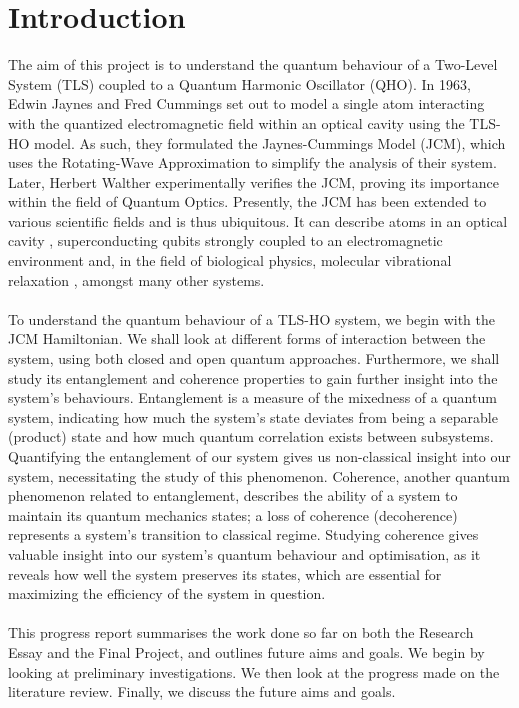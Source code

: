 \documentclass[12pt,a4paper]{article}
\begin{document}
\section{Introduction}
The aim of this project is to understand the quantum behaviour of a Two-Level System (TLS) coupled to a Quantum Harmonic Oscillator (QHO). In 1963, Edwin Jaynes and Fred Cummings set out to model a single atom interacting with the quantized electromagnetic field within an optical cavity\cite{...} using the TLS-HO model. As such, they formulated the Jaynes-Cummings Model (JCM), which uses the Rotating-Wave Approximation to simplify the analysis of their system. Later, Herbert Walther experimentally verifies\cite{...} the JCM, proving its importance within the field of Quantum Optics. Presently, the JCM has been extended to various scientific fields and is thus ubiquitous. It can describe atoms in an optical cavity \cite{H_JC}, superconducting qubits strongly coupled to an electromagnetic environment\cite{Superconducting...} and, in the field of biological physics, molecular vibrational relaxation \cite{...}, amongst many other systems.\\
\\
To understand the quantum behaviour of a TLS-HO system, we begin with the JCM Hamiltonian. We shall look at different forms of interaction between the system, using both closed and open quantum approaches. Furthermore, we shall study its entanglement and coherence properties to gain further insight into the system's behaviours. Entanglement is a measure of the mixedness of a quantum system, indicating how much the system's state deviates from being a separable (product) state\cite{E_WC_Definition} and how much quantum correlation exists between subsystems. Quantifying the entanglement of our system gives us non-classical insight into our system, necessitating the study of this phenomenon. Coherence, another quantum phenomenon related\cite{...} to entanglement, describes the ability of a system to maintain its quantum mechanics states; a loss of coherence (decoherence) represents a system's transition to classical regime. Studying coherence gives valuable insight into our system's quantum behaviour and optimisation, as it reveals how well the system preserves its states, which are essential for maximizing the efficiency of the system in question.\\
\\
This progress report summarises the work done so far on both the Research Essay and the Final Project, and outlines future aims and goals. We begin by looking at preliminary investigations. We then look at the progress made on the literature review. Finally, we discuss the future aims and goals.
\end{document}
